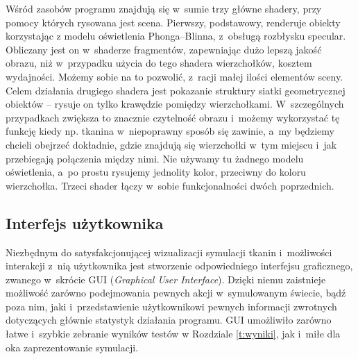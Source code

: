 		Wśród zasobów programu znajdują się w~sumie trzy główne shadery, przy pomocy których rysowana jest scena. Pierwszy, podstawowy, renderuje obiekty korzystając z modelu oświetlenia Phonga--Blinna, z~obsługą rozbłysku specular. Obliczany jest on w~shaderze fragmentów, zapewniając dużo lepszą jakość obrazu, niż w~przypadku użycia do tego shadera wierzchołków, kosztem wydajności. Możemy sobie na to pozwolić, z~racji małej ilości elementów sceny. Celem działania drugiego shadera jest pokazanie struktury siatki geometrycznej obiektów -- rysuje on tylko krawędzie pomiędzy wierzchołkami. W~szczególnych przypadkach zwiększa to znacznie czytelność obrazu i~możemy wykorzystać tę funkcję kiedy np. tkanina w~niepoprawny sposób się zawinie, a~my będziemy chcieli obejrzeć dokładnie, gdzie znajdują się wierzchołki w~tym miejscu i~jak przebiegają połączenia między nimi. Nie używamy tu żadnego modelu oświetlenia, a~po prostu rysujemy jednolity kolor, przeciwny do koloru wierzchołka. Trzeci shader łączy w~sobie funkcjonalności dwóch poprzednich.
		
		\subsection{Interfejs użytkownika}
		\label{t:praktyka:silnik:gui}
		
		
		Niezbędnym do satysfakcjonującej wizualizacji symulacji tkanin i~możliwości interakcji z~nią użytkownika jest stworzenie odpowiedniego interfejsu graficznego, zwanego w~skrócie GUI (\emph{Graphical User Interface}). Dzięki niemu zaistnieje możliwość zarówno podejmowania pewnych akcji w~symulowanym świecie, bądź poza nim, jaki i~przedstawienie użytkownikowi pewnych informacji zwrotnych dotyczących głównie statystyk działania programu. GUI umożliwiło zarówno łatwe i~szybkie zebranie wyników testów w Rozdziale \ref{t:wyniki}, jak i~miłe dla oka zaprezentowanie symulacji.
		
